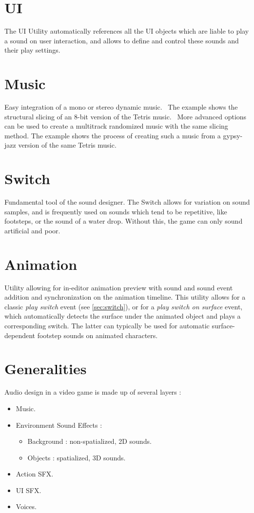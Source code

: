\documentclass[a4paper,10pt]{article}
\begin{document}
\section{UI}

The UI Utility automatically references all the UI objects which are liable to play a sound on user interaction, and allows to define and control these sounds and their play settings.


\section{Music}

Easy integration of a mono or stereo dynamic music. \
The example shows the structural slicing of an 8-bit version of the Tetris music. \
More advanced options can be used to create a multitrack randomized music with the same slicing method. The example shows the process of creating such a music from a gypsy-jazz version of the same Tetris music.


\section{Switch} \label{sec:switch}

Fundamental tool of the sound designer. The Switch allows for variation on sound samples, and is frequently used on sounds which tend to be repetitive, like footsteps, or the sound of a water drop. Without this, the game can only sound artificial and poor.

\section{Animation}

Utility allowing for in-editor animation preview with sound and sound event addition and synchronization on the animation timeline. This utility allows for a classic \textit{play switch} event (see \autoref{sec:switch}), or for a \textit{play switch on surface} event, which automatically detects the surface under the animated object and plays a corresponding switch. The latter can typically be used for automatic surface-dependent footstep sounds on animated characters.


\section{Generalities} \label{sec:gen}

Audio design in a video game is made up of several layers : \begin{itemize}
\item Music.
\item Environment Sound Effects : 
	\begin{itemize}
	\item Background : non-spatialized, 2D sounds.
	\item Objects : spatialized, 3D sounds.
	\end{itemize}
\item Action SFX.
\item UI SFX.
\item Voices.
\end{itemize}
\end{document}

